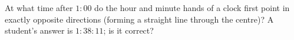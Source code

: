 At what time after $1{:}00$ do the hour and minute hands of a clock first point in exactly opposite directions (forming a straight line through the centre)? A student's answer is $1{:}38{:}11$; is it correct?

